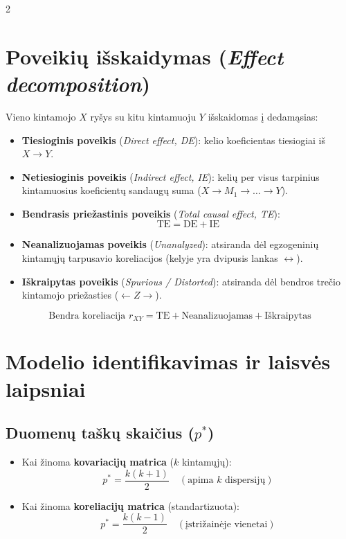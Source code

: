 \documentclass[9pt,a4paper]{article}
\begin{document}
\begin{multicols*}{2}
\section{Poveikių išskaidymas (\textit{Effect decomposition})}
Vieno kintamojo $X$ ryšys su kitu kintamuoju $Y$ išskaidomas į dedamąsias:
\begin{itemize}
    \item \textbf{Tiesioginis poveikis} (\textit{Direct effect, DE}): kelio koeficientas tiesiogiai iš $X \to Y$.
    \item \textbf{Netiesioginis poveikis} (\textit{Indirect effect, IE}): kelių per visus tarpinius kintamuosius koeficientų sandaugų suma ($X \to M_1 \to \dots \to Y$).
    \item \textbf{Bendrasis priežastinis poveikis} (\textit{Total causal effect, TE}):
    \begin{equation*}
        \text{TE} = \text{DE} + \text{IE}
    \end{equation*}
    \item \textbf{Neanalizuojamas poveikis} (\textit{Unanalyzed}): atsiranda dėl egzogeninių kintamųjų tarpusavio koreliacijos (kelyje yra dvipusis lankas $\leftrightarrow$).
    \item \textbf{Iškraipytas poveikis} (\textit{Spurious / Distorted}): atsiranda dėl bendros trečio kintamojo priežasties ($\leftarrow Z \to$).
\end{itemize}
\begin{equation*}
    \text{Bendra koreliacija } r_{XY} = \text{TE} + \text{Neanalizuojamas} + \text{Iškraipytas}
\end{equation*}

\section{Modelio identifikavimas ir laisvės laipsniai}
\subsection{Duomenų taškų skaičius ($p^*$)}
\begin{itemize}
    \item Kai žinoma \textbf{kovariacijų matrica} ($k$ kintamųjų):
    \begin{equation*}
        p^* = \frac{k(k + 1)}{2} \quad (\text{apima } k \text{ dispersijų})
    \end{equation*}
    \item Kai žinoma \textbf{koreliacijų matrica} (standartizuota):
    \begin{equation*}
        p^* = \frac{k(k - 1)}{2} \quad (\text{įstrižainėje vienetai})
    \end{equation*}
\end{itemize}


\end{multicols*}
\end{document}
